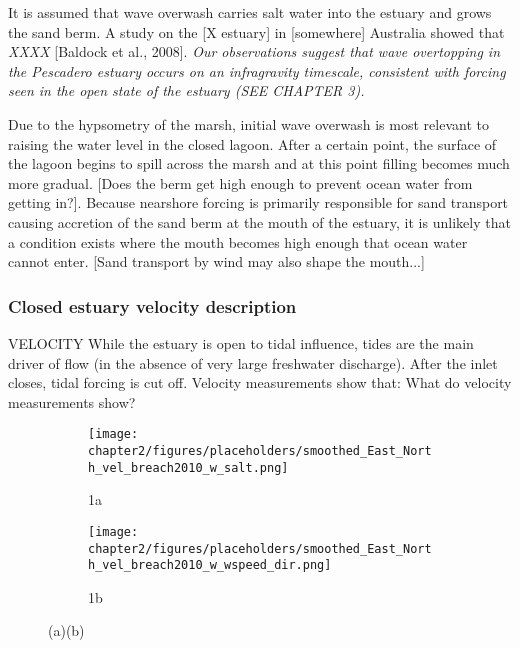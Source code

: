 It is assumed that wave overwash carries salt water into the estuary and
grows the sand berm. A study on the [X estuary] in [somewhere] Australia
showed that \emph{XXXX} [Baldock et al., 2008]. \emph{Our observations suggest that wave overtopping in the Pescadero 
estuary occurs on an infragravity timescale, consistent with forcing seen in the open state of the estuary (SEE CHAPTER 3).}

Due to the hypsometry of the marsh, initial wave overwash is most
relevant to raising the water level in the closed lagoon. After a
certain point, the surface of the lagoon begins to spill across the
marsh and at this point filling becomes much more gradual. [Does the
berm get high enough to prevent ocean water from getting in?]. Because
nearshore forcing is primarily responsible for sand transport causing accretion of the sand berm at the mouth of the estuary, it is unlikely that a
condition exists where the mouth becomes high enough that ocean water
cannot enter. [Sand transport by wind may also shape the mouth...]

\subsubsection{Closed estuary velocity description} \label{cl_vel}
VELOCITY While the estuary is open to tidal influence, tides are the
main driver of flow (in the absence of very large freshwater discharge).
After the inlet closes, tidal forcing is cut off. Velocity measurements
show that: {What do velocity measurements show?}


\begin{figure}[t]
\begin{subfigure}{.5\textwidth}
	\centering
	\texttt{[image: chapter2/figures/placeholders/smoothed\_East\_North\_vel\_breach2010\_w\_salt.png]}
	\caption{1a}
	\label{fig:closed_UVwindsalta}
\end{subfigure}
\begin{subfigure}{.5\textwidth}
	\centering
	\texttt{[image: chapter2/figures/placeholders/smoothed\_East\_North\_vel\_breach2010\_w\_wspeed\_dir.png]}
	\caption{1b}
	\label{fig:closed_UVwindsaltb}
\end{subfigure}
\caption{(a)(b)}
\label{fig:close_UVwindsalt}
\end{figure}


